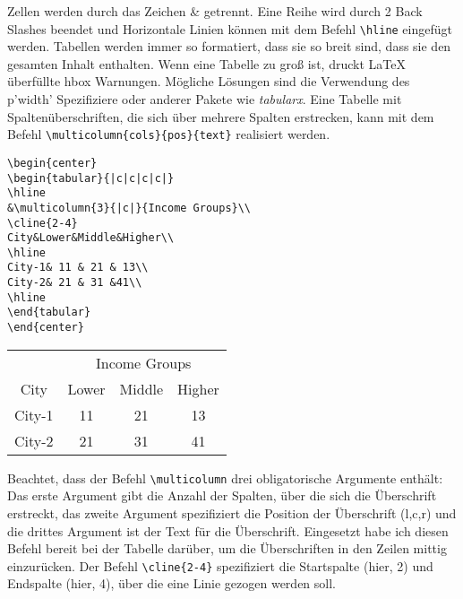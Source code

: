 Zellen werden durch das Zeichen \& getrennt. Eine Reihe wird durch 2 Back Slashes beendet und Horizontale Linien können mit dem Befehl \verb|\hline| eingefügt werden.
Tabellen werden immer so formatiert, dass sie so breit sind, dass sie den gesamten Inhalt enthalten. Wenn eine Tabelle zu groß ist, druckt LaTeX überfüllte hbox Warnungen. Mögliche Lösungen sind die Verwendung des p{'width'} Spezifiziere oder anderer Pakete wie \emph{tabularx}. Eine Tabelle mit Spaltenüberschriften, die sich über mehrere Spalten erstrecken, kann mit dem Befehl \verb|\multicolumn{cols}{pos}{text}| realisiert werden.

\begin{lstlisting}[style=LaTeX]
\begin{center}
\begin{tabular}{|c|c|c|c|}
\hline
&\multicolumn{3}{|c|}{Income Groups}\\
\cline{2-4}
City&Lower&Middle&Higher\\
\hline
City-1& 11 & 21 & 13\\
City-2& 21 & 31 &41\\
\hline
\end{tabular}
\end{center}
\end{lstlisting}

\begin{center}
	\begin{tabular}{|c|c|c|c|}
		\hline
		&\multicolumn{3}{|c|}{Income Groups}\\
		\cline{2-4}
		City&Lower&Middle&Higher\\
		\hline
		City-1& 11 & 21 & 13\\
		City-2& 21 & 31 &41\\
		\hline
	\end{tabular}
\end{center}
\bigskip

Beachtet, dass der Befehl \verb|\multicolumn| drei obligatorische Argumente enthält: Das erste Argument gibt die Anzahl der Spalten, über die sich die Überschrift erstreckt, das zweite Argument spezifiziert die Position der Überschrift (l,c,r) und die drittes Argument ist der Text für die Überschrift. Eingesetzt habe ich diesen Befehl bereit bei der Tabelle darüber, um die Überschriften in den Zeilen mittig einzurücken. Der Befehl \verb|\cline{2-4}| spezifiziert die Startspalte (hier, 2) und Endspalte (hier, 4), über die eine Linie gezogen werden soll.

\bigskip

